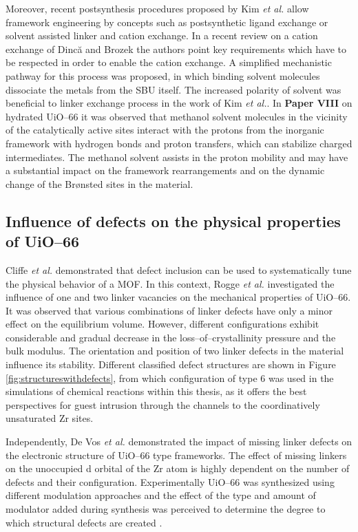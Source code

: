 Moreover, recent postsynthesis
procedures proposed by Kim \textit{et al.}\cite{Kim2012,Kim2012a} allow
framework engineering by concepts such as postsynthetic ligand exchange or solvent assisted linker and cation exchange.
In a recent review on a cation exchange of Dinc\u{a} and Brozek
\cite{Brozek2014} the authors point key requirements which have to be respected
in order to enable the cation exchange. A simplified mechanistic pathway for this process was
proposed, in which binding solvent molecules dissociate the metals from the SBU
itself. The increased polarity of solvent was beneficial to linker exchange
process in the work of Kim \textit{et al.}\cite{Kim2012}. In \textbf{Paper VIII}
on hydrated UiO--66 it was observed that methanol solvent molecules in the vicinity of the catalytically active sites interact with the protons from the inorganic framework with hydrogen bonds and proton transfers, which can stabilize charged intermediates. The methanol solvent assists in the proton mobility and may have a substantial impact on the framework rearrangements and on the dynamic change of the Br\o{}nsted sites in the material.


\subsection*{Influence of defects on the physical properties of UiO--66}
Cliffe \textit{et al.}\cite{Cliffe2015}  demonstrated that defect inclusion can
be used to systematically tune the physical behavior of a MOF.
In this context, Rogge \textit{et al.}\cite{Rogge2016}
investigated the influence of one and two linker vacancies on the mechanical
properties of UiO--66.
It was observed that various combinations of linker defects have only a minor effect on the
equilibrium volume. However, different configurations exhibit considerable and
gradual decrease in the loss--of--crystallinity pressure and the bulk modulus.
The orientation and position of two linker defects in the material
influence its stability. Different classified defect structures are shown in
Figure \ref{fig:structureswithdefects}, from which configuration of type 6 was
used in the simulations of chemical reactions within this thesis, as it offers
the best perspectives for guest intrusion through the channels to the coordinatively
unsaturated Zr sites.

Independently, De Vos \textit{et al.}\cite{DeVos2017} demonstrated the impact
of missing linker defects on the electronic structure of UiO--66 
type frameworks. The effect of missing linkers on the unoccupied
d orbital of the Zr atom is highly dependent on the number of defects and their
configuration.
Experimentally UiO--66 was synthesized using different modulation
approaches and the effect of the type and amount of modulator added during
synthesis was perceived to determine the degree to which structural defects are
created \cite{Vermoortele2013, Shearer2016, Cliffe2014, Morris2017mod}.


